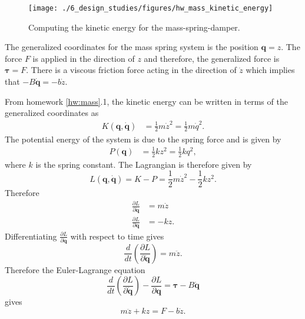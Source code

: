 

\begin{figure}[H]
   \centering
   \texttt{[image: ./6\_design\_studies/figures/hw\_mass\_kinetic\_energy]} 
   \caption{Computing the kinetic energy for the mass-spring-damper.}
   \label{fig:hw_mass_kinetic_energy}
\end{figure}

The generalized coordinates for the mass spring system is the position $\mathbf{q}=z$.   The force $F$ is applied in the direction of $z$ and therefore, the generalized force is  $\boldsymbol{\tau} = F$.  There is a viscous friction force acting in the direction of $\dot{z}$ which implies that $-B\dot{\mathbf{q}} = - b\dot{z}$.

From homework \ref{hw:mass}.1, the kinetic energy can be written in terms of the generalized coordinates as
\begin{align*}
K(\mathbf{q},\dot{\mathbf{q}}) &= \frac{1}{2} m \dot{z}^2 = \frac{1}{2} m \dot{q}^2.
\end{align*}
The potential energy of the system is due to the spring force and is given by
\begin{align*}
P(\mathbf{q}) &= \frac{1}{2} k z^2 = \frac{1}{2} k q^2,
\end{align*}
where $k$ is the spring constant. 
The Lagrangian is therefore given by
\[
L(\mathbf{q},\dot{\mathbf{q}}) = K - P = \frac{1}{2} m \dot{z}^2 - \frac{1}{2} k z^2.
\]
Therefore
\begin{align*}
\frac{\partial L}{\partial\dot{\mathbf{q}}} &= m \dot{z} \\
\frac{\partial L}{\partial\mathbf{q}} &= - kz.
\end{align*}
Differentiating $\frac{\partial L}{\partial \dot{\mathbf{q}}}$ with respect to time gives
\[
\frac{d}{dt}\left(\frac{\partial L}{\partial \dot{\mathbf{q}}}\right) = m \ddot{z}.
\]
Therefore the Euler-Lagrange equation
\[
\frac{d}{dt}\left(\frac{\partial L}{\partial\dot{\mathbf{q}}} \right) - \frac{\partial L}{\partial \mathbf{q}} =  \boldsymbol{\tau} -B\dot{\mathbf{q}}
\]
gives
\[
m \ddot{z} + kz = F - b \dot{z}.
\]
